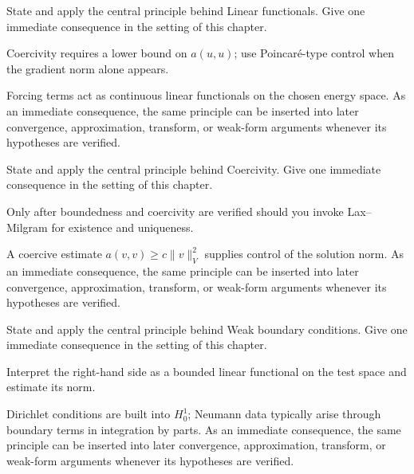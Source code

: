 \begin{exercise}\label{exr:iii23-04}
State and apply the central principle behind Linear functionals. Give one immediate consequence in the setting of this chapter.
\end{exercise}
\begin{hint}
Coercivity requires a lower bound on \(a(u,u)\); use Poincaré-type control when the gradient norm alone appears.
\end{hint}
\begin{solution}
Forcing terms act as continuous linear functionals on the chosen energy space. As an immediate consequence, the same principle can be inserted into later convergence, approximation, transform, or weak-form arguments whenever its hypotheses are verified.
\end{solution}

\begin{exercise}\label{exr:iii23-05}
State and apply the central principle behind Coercivity. Give one immediate consequence in the setting of this chapter.
\end{exercise}
\begin{hint}
Only after boundedness and coercivity are verified should you invoke Lax--Milgram for existence and uniqueness.
\end{hint}
\begin{solution}
A coercive estimate $a(v,v)\ge c\|v\|_V^2$ supplies control of the solution norm. As an immediate consequence, the same principle can be inserted into later convergence, approximation, transform, or weak-form arguments whenever its hypotheses are verified.
\end{solution}

\begin{exercise}\label{exr:iii23-06}
State and apply the central principle behind Weak boundary conditions. Give one immediate consequence in the setting of this chapter.
\end{exercise}
\begin{hint}
Interpret the right-hand side as a bounded linear functional on the test space and estimate its norm.
\end{hint}
\begin{solution}
Dirichlet conditions are built into $H_0^1$; Neumann data typically arise through boundary terms in integration by parts. As an immediate consequence, the same principle can be inserted into later convergence, approximation, transform, or weak-form arguments whenever its hypotheses are verified.
\end{solution}

